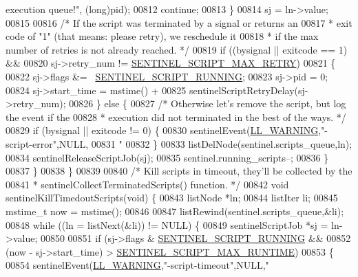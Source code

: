 \begin{DoxyCode}
{{{{{{{{{{{{{{       execution queue!"}, (\textcolor{keywordtype}{long})pid);
00812             \textcolor{keywordflow}{continue};
00813         \}
00814         sj = ln->value;
00815 
00816         \textcolor{comment}{/* If the script was terminated by a signal or returns an}
00817 \textcolor{comment}{         * exit code of "1" (that means: please retry), we reschedule it}
00818 \textcolor{comment}{         * if the max number of retries is not already reached. */}
00819         \textcolor{keywordflow}{if} ((bysignal || exitcode == 1) &&
00820             sj->retry\_num != \hyperlink{sentinel_8c_a38f813a1d1e8f88b2ca76c064c61b6aa}{SENTINEL\_SCRIPT\_MAX\_RETRY})
00821         \{
00822             sj->flags &= ~\hyperlink{sentinel_8c_a0211d42099c07769ec06cc0010f9b58e}{SENTINEL\_SCRIPT\_RUNNING};
00823             sj->pid = 0;
00824             sj->start\_time = mstime() +
00825                              sentinelScriptRetryDelay(sj->retry\_num);
00826         \} \textcolor{keywordflow}{else} \{
00827             \textcolor{comment}{/* Otherwise let's remove the script, but log the event if the}
00828 \textcolor{comment}{             * execution did not terminated in the best of the ways. */}
00829             \textcolor{keywordflow}{if} (bysignal || exitcode != 0) \{
00830                 sentinelEvent(\hyperlink{server_8h_a31229b9334bba7d6be2a72970967a14b}{LL\_WARNING},\textcolor{stringliteral}{"-script-error"},NULL,
00831                               \textcolor{stringliteral}{"%
00832             \}
00833             listDelNode(sentinel.scripts\_queue,ln);
00834             sentinelReleaseScriptJob(sj);
00835             sentinel.running\_scripts--;
00836         \}
00837     \}
00838 \}
00839 
00840 \textcolor{comment}{/* Kill scripts in timeout, they'll be collected by the}
00841 \textcolor{comment}{ * sentinelCollectTerminatedScripts() function. */}
00842 \textcolor{keywordtype}{void} sentinelKillTimedoutScripts(\textcolor{keywordtype}{void}) \{
00843     listNode *ln;
00844     listIter li;
00845     mstime\_t now = mstime();
00846 
00847     listRewind(sentinel.scripts\_queue,&li);
00848     \textcolor{keywordflow}{while} ((ln = listNext(&li)) != NULL) \{
00849         sentinelScriptJob *sj = ln->value;
00850 
00851         \textcolor{keywordflow}{if} (sj->flags & \hyperlink{sentinel_8c_a0211d42099c07769ec06cc0010f9b58e}{SENTINEL\_SCRIPT\_RUNNING} &&
00852             (now - sj->start\_time) > \hyperlink{sentinel_8c_ae8eb69271e56d5d14527c64cdeeaf678}{SENTINEL\_SCRIPT\_MAX\_RUNTIME})
00853         \{
00854             sentinelEvent(\hyperlink{server_8h_a31229b9334bba7d6be2a72970967a14b}{LL\_WARNING},\textcolor{stringliteral}{"-script-timeout"},NULL,\textcolor{stringliteral}{"%
}}}}}}}}}}}}}}}
\end{DoxyCode}
